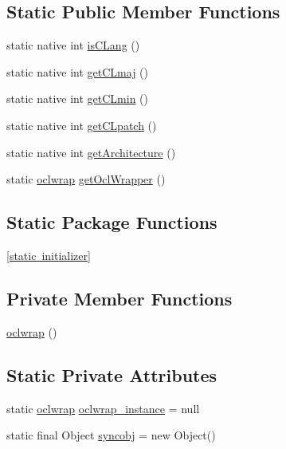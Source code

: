 \subsection*{Static Public Member Functions}
\begin{DoxyCompactItemize}
\item 
static native int \mbox{\hyperlink{classcom_1_1example_1_1dmocl_1_1oclwrap_a3af03274f6d65e914c0f61ecc4541392}{is\+C\+Lang}} ()
\item 
static native int \mbox{\hyperlink{classcom_1_1example_1_1dmocl_1_1oclwrap_a8d3b11bda003fad87ae98abd2dc20217}{get\+C\+Lmaj}} ()
\item 
static native int \mbox{\hyperlink{classcom_1_1example_1_1dmocl_1_1oclwrap_ab21e9c2f0e53aba97cbe3a9937c9e7bf}{get\+C\+Lmin}} ()
\item 
static native int \mbox{\hyperlink{classcom_1_1example_1_1dmocl_1_1oclwrap_ab693cebf65c86567189ea1f71bff0250}{get\+C\+Lpatch}} ()
\item 
static native int \mbox{\hyperlink{classcom_1_1example_1_1dmocl_1_1oclwrap_afd9731ebb0d18315fe3762fc329fcec4}{get\+Architecture}} ()
\item 
static \mbox{\hyperlink{classcom_1_1example_1_1dmocl_1_1oclwrap}{oclwrap}} \mbox{\hyperlink{classcom_1_1example_1_1dmocl_1_1oclwrap_a8c8c9a75d3d834cb71725d92ddeb4af7}{get\+Ocl\+Wrapper}} ()
\end{DoxyCompactItemize}
\subsection*{Static Package Functions}
\begin{DoxyCompactItemize}
\item 
\mbox{\hyperlink{classcom_1_1example_1_1dmocl_1_1oclwrap_ae22983442bc86659fcfb0a5711af7efc}{\mbox{[}static initializer\mbox{]}}}
\end{DoxyCompactItemize}
\subsection*{Private Member Functions}
\begin{DoxyCompactItemize}
\item 
\mbox{\hyperlink{classcom_1_1example_1_1dmocl_1_1oclwrap_a1fbb83793ed7801f73e2a0ca2cf0f114}{oclwrap}} ()
\end{DoxyCompactItemize}
\subsection*{Static Private Attributes}
\begin{DoxyCompactItemize}
\item 
static \mbox{\hyperlink{classcom_1_1example_1_1dmocl_1_1oclwrap}{oclwrap}} \mbox{\hyperlink{classcom_1_1example_1_1dmocl_1_1oclwrap_a3d8e0d80008bcd1d88fdf3f42cd1e653}{oclwrap\+\_\+instance}} = null
\item 
static final Object \mbox{\hyperlink{classcom_1_1example_1_1dmocl_1_1oclwrap_a5bdc019edb3f9334eae7a368cf0bd5c8}{syncobj}} = new Object()
\end{DoxyCompactItemize}


